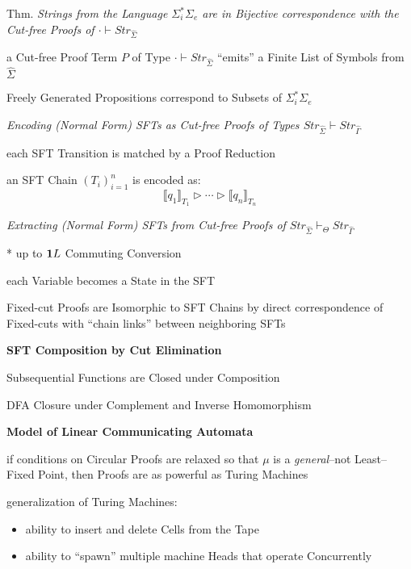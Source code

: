 Thm. \emph{Strings from the Language $\Sigma_i^*\Sigma_e$ are in
  Bijective correspondence with the Cut-free Proofs of $\cdot\vdash
  Str_{\hat{\Sigma}}$}

a Cut-free Proof Term $P$ of Type $\cdot\vdash Str_{\hat{\Sigma}}$
``emits'' a Finite List of Symbols from $\hat{\Sigma}$

Freely Generated Propositions correspond to Subsets of
$\Sigma_i^*\Sigma_e$


\emph{Encoding (Normal Form) SFTs as Cut-free Proofs of Types
  $Str_{\hat{\Sigma}} \vdash Str_{\hat{\Gamma}}$} %

each SFT Transition is matched by a Proof Reduction

an SFT Chain $(T_i)^n_{i=1}$ is encoded as:
\[
  \llbracket{q_1}\rrbracket_{T_1} \rhd \cdots \rhd
  \llbracket{q_n}\rrbracket_{T_n}
\]


\emph{Extracting (Normal Form) SFTs from Cut-free Proofs of
  $Str_{\hat{\Sigma}} \vdash_\Theta Str_{\hat{\Gamma}}$}

* up to $\mathbf{1}{L}$ Commuting Conversion

each Variable becomes a State in the SFT

Fixed-cut Proofs are Isomorphic to SFT Chains by direct correspondence
of Fixed-cuts with ``chain links'' between neighboring SFTs


\textbf{SFT Composition by Cut Elimination}

Subsequential Functions are Closed under Composition

DFA Closure under Complement and Inverse Homomorphism


\textbf{Model of Linear Communicating Automata}

if conditions on Circular Proofs are relaxed so that $\mu$ is a
\emph{general}--not Least--Fixed Point, then Proofs are as powerful as
Turing Machines

generalization of Turing Machines:
\begin{itemize}
  \item ability to insert and delete Cells from the Tape
  \item ability to ``spawn'' multiple machine Heads that operate
    Concurrently
\end{itemize}

